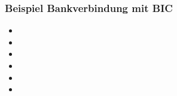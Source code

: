 \documentclass[12pt,ngerman]{beamer}
\begin{document}
\begin{frame}
\frametitle{Beispiel Bankverbindung mit BIC}


\begin{itemize}
\item 
\item 
\item 
\item 
\item 
\item 
\end{itemize}
\end{frame}
\end{document}
